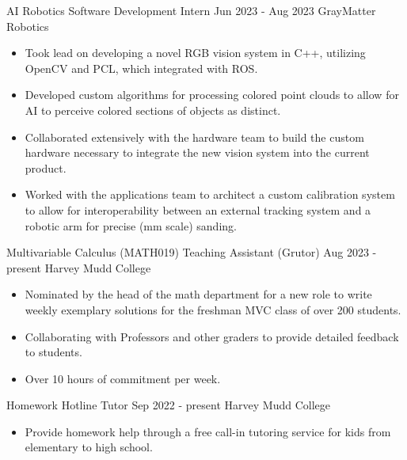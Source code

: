\documentclass[9pt]{resume}
\begin{document}
    
    \vspace{0.5cm}

    \begin{experiencelist}
        \experience 
            {AI Robotics Software Development Intern}
            {Jun 2023 - Aug 2023}
            {GrayMatter Robotics}
            {\begin{itemize}[noitemsep, topsep=1pt]
                \item Took lead on developing a novel RGB vision system in C++, utilizing OpenCV and PCL, which integrated with ROS.
                \item Developed custom algorithms for processing colored point clouds to allow for AI to perceive colored sections of objects as distinct.
                \item Collaborated extensively with the hardware team to build the custom hardware necessary to integrate the new vision system into the current product.
                \item Worked with the applications team to architect a custom calibration system to allow for interoperability between an external tracking system and a robotic arm for precise (mm scale) sanding.
            \end{itemize}}
        \experience 
            {Multivariable Calculus (MATH019) Teaching Assistant (Grutor)}
            {Aug 2023 - present}
            {Harvey Mudd College}
            {\begin{itemize}[noitemsep, topsep=1pt] 
                \item Nominated by the head of the math department for a new role to write weekly exemplary solutions for the freshman MVC class of over 200 students.
                \item Collaborating with Professors and other graders to provide detailed feedback to students. 
                \item Over 10 hours of commitment per week.
            \end{itemize}}
        \experience
            {Homework Hotline Tutor}
            {Sep 2022 - present} 
            {Harvey Mudd College}
            {\begin{itemize}[noitemsep, topsep=1pt]
                \item Provide homework help through a free call-in tutoring service for kids from elementary to high school.
            \end{itemize}}
    \end{experiencelist}
\end{document}
